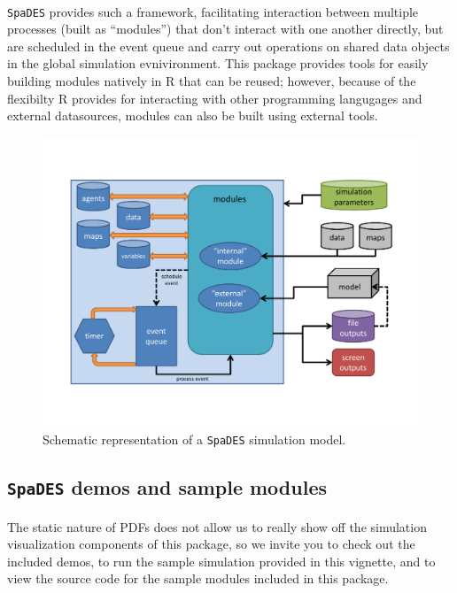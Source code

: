 \documentclass{article}
\begin{document}
\paragraph{}
\texttt{SpaDES} provides such a framework, facilitating interaction between multiple processes (built as ``modules'') that don't interact with one another directly, but are scheduled in the event queue and carry out operations on shared data objects in the global simulation evnivironment. This package provides tools for easily building modules natively in \textsf{R} that can be reused; however, because of the flexibilty R provides for interacting with other programming langugages and external datasources, modules can also be built using external tools.

\begin{figure}[!htbp]
  \centering
	\includegraphics[width=5in]{../inst/SpaDES-overview-diagram.pdf}
	\caption{Schematic representation of a \texttt{SpaDES} simulation model.}
	\label{figure-SpaDES-overview}
\end{figure}

\subsection{\texttt{SpaDES} demos and sample modules}

\paragraph{}
The static nature of PDFs does not allow us to really show off the simulation visualization components of this package, so we invite you to check out the included demos, to run the sample simulation provided in this vignette, and to view the source code for the sample modules included in this package.
\end{document}
